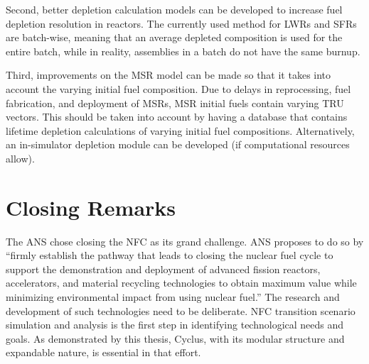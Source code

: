 Second, better depletion calculation models can be developed to increase
fuel depletion resolution in reactors. The currently used method for
\glspl{LWR} and \glspl{SFR} are batch-wise, meaning that an average
depleted composition is used for the entire batch, while in reality,
assemblies in a batch do not have the same burnup.

Third, improvements on the \gls{MSR} model can be made so that it
takes into account the varying initial fuel composition. Due to delays
in reprocessing, fuel fabrication, and deployment of \glspl{MSR}, \gls{MSR}
initial fuels contain varying \gls{TRU} vectors. This should be taken into
account by having a database that contains lifetime depletion calculations
of varying initial fuel compositions. Alternatively, an in-simulator
depletion module can be developed (if computational resources allow).


\section{Closing Remarks}
The \gls{ANS} chose closing the \gls{NFC} as its grand challenge. \gls{ANS}
proposes to do so by ``firmly establish the pathway that leads to closing
the nuclear fuel cycle to support the demonstration and deployment of
advanced fission reactors, accelerators, and material recycling technologies
to obtain maximum value while minimizing environmental impact 
from using nuclear fuel.'' The research and development of such technologies
need to be deliberate. \gls{NFC} transition scenario simulation and 
analysis is the first step in identifying technological needs
and goals.  As demonstrated by this thesis, Cyclus, with its
modular structure and expandable nature, is essential in that effort.